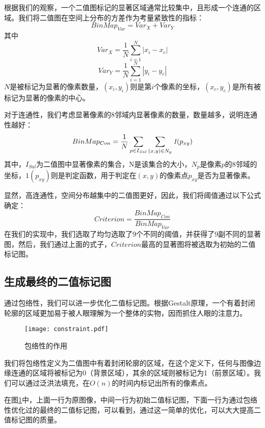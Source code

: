 根据我们的观察，一个二值图标记的显著区域通常比较集中，且形成一个连通的区域。我们将二值图在空间上分布的方差作为考量紧致性的指标：
\begin{equation}
BinMap_{Var} = Var_X + Var_Y
\end{equation}
其中
\begin{equation}
Var_X = \frac{1}{N} \sum_{i=1}^N |x_i-x_c|
\end{equation}
\begin{equation}
Var_Y = \frac{1}{N} \sum_{i=1}^N |y_i-y_c|
\end{equation}
$N$是被标记为显著的像素数量，$(x_i,y_i)$则是第$i$个像素的坐标，$(x_c,y_c)$是所有被标记为显著的像素的中心。

对于连通性，我们考虑显著像素的8邻域内显著像素的数量，数量越多，说明连通性越好：
\begin{equation}
BinMap_{Con} = \frac{1}{N}\sum_{p\in I_{Sal}}\sum_{(x,y)\in N_p}\emph{1}(p_{xy})
\end{equation}
其中，$I_{Sal}$为二值图中显著像素的集合，N是该集合的大小，$N_p$是像素$p$的8邻域的坐标，$1(p_{xy})$则是判定函数，用于判定在$(x,y)$的像素点$p_{xy}$是否为显著像素。

显然，高连通性，空间分布越集中的二值图更好，因此，我们将阈值通过以下公式确定：
\begin{equation}
Criterion = \frac{BinMap_{Con}}{BinMap_{Var}}
\end{equation}
在我们的实现中，我们选取了均匀选取了9个不同的阈值，并获得了9副不同的显著图，然后，我们通过上面的式子，$Criterion$最高的显著图将被选取为初始的二值标记图。

\subsection{生成最终的二值标记图}
通过包络性，我们可以进一步优化二值标记图。根据Gestalt原理\cite{beardslee1958readings}，一个有着封闭轮廓的区域更加易于被人眼理解为一个整体的实物，因而抓住人眼的注意力。

\begin{figure}
\centering
\texttt{[image: constraint.pdf]}
\caption{包络性的作用} \label{fig:constraint}
\end{figure}

我们将包络性定义为二值图中有着封闭轮廓的区域，在这个定义下，任何与图像边缘连通的区域将被标记为0（背景区域），其余的区域则被标记为1（前景区域）。我们可以通过泛洪法填充，在$O(n)$的时间内标记出所有的像素点。

在图\ref{fig:constraint}中，上面一行为原图像，中间一行为初始二值标记图，下面一行为通过包络性优化过的最终的二值标记图，可以看到，通过这一简单的优化，可以大大提高二值标记图的质量。

